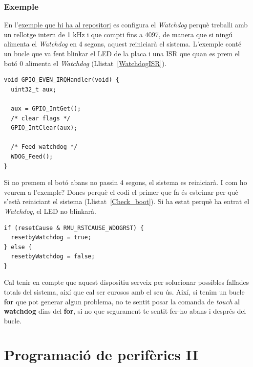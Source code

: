 \section{Exemple}
\label{sub:Watchdog_example}
En l'\href{https://github.com/mariusmm/cursembedded/tree/master/Simplicity/Watchdog}{exemple que hi ha al repositori}
es configura el {\em Watchdog} perquè treballi amb un rellotge intern de 1 kHz i que compti fins a 4097, de manera que si ningú alimenta el {\em Watchdog} en 4 segons, aquest reiniciarà el sistema. L'exemple conté un bucle que va fent blinkar el LED de la placa i una \gls{ISR} que quan es prem el botó 0 alimenta el {\em Watchdog} (Llistat~\ref{WatchdogISR}).

\begin{lstlisting}[style=customc,caption={ISR del botó que alimenta el {\em Watchdog}},label=WatchdogISR]
void GPIO_EVEN_IRQHandler(void) {
  uint32_t aux;

  aux = GPIO_IntGet();
  /* clear flags */
  GPIO_IntClear(aux);

  /* Feed watchdog */
  WDOG_Feed();
}
\end{lstlisting}

Si no premem el botó abans no passin 4 segons, el sistema es reiniciarà. I com ho veurem a l'exemple? Doncs perquè el codi el primer que fa és esbrinar per què s'està reiniciant el sistema (Llistat~\ref{Check_boot}). Si ha estat perquè ha entrat el {\em Watchdog}, el LED no blinkarà.

\begin{lstlisting}[style=customc,caption={Codi per detectar la causa del reinici},label=Check_boot]
if (resetCause & RMU_RSTCAUSE_WDOGRST) {
  resetbyWatchdog = true;
} else {
  resetbyWatchdog = false;
}
\end{lstlisting}

Cal tenir en compte que aquest dispositiu serveix per solucionar possibles fallades totals del sistema, així que cal ser curosos amb el seu ús. Així, si tenim un bucle {\bf for} que pot generar algun problema, no te sentit posar la comanda de {\em touch} al {\bf watchdog} dins del {\bf for}, si no que segurament te sentit fer-ho abans i després del bucle.

\part{Programació de perifèrics II}
\label{part:programacio_2}

